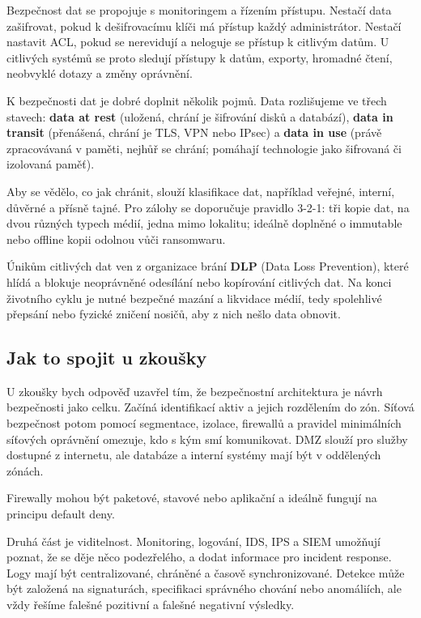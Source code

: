 \documentclass[11pt,a4paper]{article}
\begin{document}
Bezpečnost dat se propojuje s monitoringem a řízením přístupu. Nestačí data zašifrovat, pokud k dešifrovacímu klíči má přístup každý administrátor. Nestačí nastavit ACL, pokud se nerevidují a neloguje se přístup k citlivým datům. U citlivých systémů se proto sledují přístupy k datům, exporty, hromadné čtení, neobvyklé dotazy a změny oprávnění.

K bezpečnosti dat je dobré doplnit několik pojmů. Data rozlišujeme ve třech stavech: \textbf{data at rest} (uložená, chrání je šifrování disků a databází), \textbf{data in transit} (přenášená, chrání je TLS, VPN nebo IPsec) a \textbf{data in use} (právě zpracovávaná v paměti, nejhůř se chrání; pomáhají technologie jako šifrovaná či izolovaná paměť).

Aby se vědělo, co jak chránit, slouží klasifikace dat, například veřejné, interní, důvěrné a přísně tajné. Pro zálohy se doporučuje pravidlo 3-2-1: tři kopie dat, na dvou různých typech médií, jedna mimo lokalitu; ideálně doplněné o immutable nebo offline kopii odolnou vůči ransomwaru.

Únikům citlivých dat ven z organizace brání \textbf{DLP} (Data Loss Prevention), které hlídá a blokuje neoprávněné odesílání nebo kopírování citlivých dat. Na konci životního cyklu je nutné bezpečné mazání a likvidace médií, tedy spolehlivé přepsání nebo fyzické zničení nosičů, aby z nich nešlo data obnovit.

\subsection*{Jak to spojit u zkoušky}

U zkoušky bych odpověď uzavřel tím, že bezpečnostní architektura je návrh bezpečnosti jako celku. Začíná identifikací aktiv a jejich rozdělením do zón. Síťová bezpečnost potom pomocí segmentace, izolace, firewallů a pravidel minimálních síťových oprávnění omezuje, kdo s kým smí komunikovat. DMZ slouží pro služby dostupné z internetu, ale databáze a interní systémy mají být v oddělených zónách.

Firewally mohou být paketové, stavové nebo aplikační a ideálně fungují na principu default deny.

Druhá část je viditelnost. Monitoring, logování, IDS, IPS a SIEM umožňují poznat, že se děje něco podezřelého, a dodat informace pro incident response. Logy mají být centralizované, chráněné a časově synchronizované. Detekce může být založená na signaturách, specifikaci správného chování nebo anomáliích, ale vždy řešíme falešné pozitivní a falešné negativní výsledky.
\end{document}
